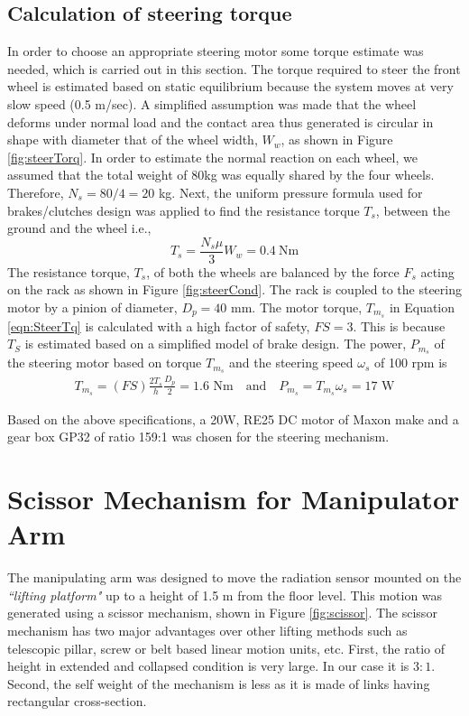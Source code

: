 \subsection{Calculation of steering torque}
\label{sec:SteerinTorqueStatic}
In order to choose an appropriate steering motor some torque estimate was needed, which is carried out in this section. 
The torque required to steer the front wheel is estimated based on static equilibrium because the system moves at very slow speed (0.5 m/sec). A simplified assumption was made that the wheel deforms under normal load and the contact area thus generated is  circular in shape with diameter that of the wheel width, $W_w$, as shown in Figure \ref{fig:steerTorq}. 
In order to estimate the normal reaction on each wheel, we assumed that the total weight of 80kg was equally shared by the four wheels. 
Therefore, $N_s=80/4=20$ kg. Next, the uniform pressure formula \cite{TOMBook} used for  brakes/clutches design was applied to find the resistance  torque $T_s$, between the ground and the wheel i.e., 
\begin{equation}
\label{eqn:brake}
T_s=\frac{N_s\mu}{3}W_w= 0.4~\text{Nm}
\end{equation}  
The resistance torque, $T_s$, of  both the wheels  are balanced by the force $F_s$ acting on the rack as shown in Figure \ref{fig:steerCond}. The rack is coupled to the steering motor by a pinion of diameter, $D_p=40$ mm. The motor  torque, $T_{m_s}$  in Equation  \ref{eqn:SteerTq} is calculated with a  high factor of safety, $FS=3$. This is because $T_S$ is estimated  based on a simplified model of brake design. The power, $P_{m_s}$ of the steering motor based on  torque $T_{m_s}$ and the steering speed $\omega_s$ of 100  rpm is 
\begin{equation}
\begin{aligned}
\label{eqn:SteerTq}
T_{m_s}=(FS)\frac{2T_s}{h}\frac{D_p}{2}=1.6\text{ Nm} \quad \text{and}\quad P_{m_s}=T_{m_s}\omega_s=17\text{ W}
\end{aligned}
\end{equation} 

Based on the above specifications, a 20W, RE25 DC motor of Maxon  make and a gear box  GP32 of ratio 159:1 was chosen for the steering mechanism. 
 
\section{Scissor Mechanism for Manipulator Arm}
 The manipulating arm  was designed to move  the radiation sensor mounted on the \textit{``lifting platform"} up to a height of 1.5 m from the floor level. This motion was generated using  a scissor mechanism,  shown in Figure \ref{fig:scissor}. The scissor mechanism has two major advantages over other lifting methods such as telescopic pillar, screw or belt based linear motion units, etc.  First, the  ratio of height in extended and collapsed condition is very large. In our case it is $3:1$. Second, the self weight of the mechanism is less as it is made of links having rectangular cross-section.

